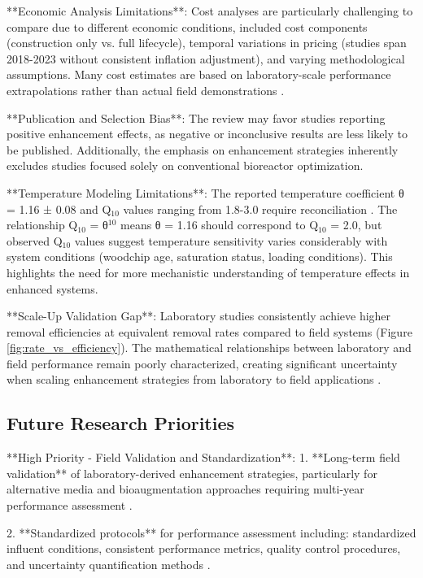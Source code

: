 \documentclass[12pt,a4paper]{article}
\begin{document}
**Economic Analysis Limitations**: Cost analyses are particularly challenging to compare due to different economic conditions, included cost components (construction only vs. full lifecycle), temporal variations in pricing (studies span 2018-2023 without consistent inflation adjustment), and varying methodological assumptions. Many cost estimates are based on laboratory-scale performance extrapolations rather than actual field demonstrations \citep{RN289}.

**Publication and Selection Bias**: The review may favor studies reporting positive enhancement effects, as negative or inconclusive results are less likely to be published. Additionally, the emphasis on enhancement strategies inherently excludes studies focused solely on conventional bioreactor optimization.

**Temperature Modeling Limitations**: The reported temperature coefficient θ = 1.16 ± 0.08 and Q$_{10}$ values ranging from 1.8-3.0 require reconciliation \citep{RN242, RN228}. The relationship Q$_{10}$ = θ$^{10}$ means θ = 1.16 should correspond to Q$_{10}$ = 2.0, but observed Q$_{10}$ values suggest temperature sensitivity varies considerably with system conditions (woodchip age, saturation status, loading conditions). This highlights the need for more mechanistic understanding of temperature effects in enhanced systems.

**Scale-Up Validation Gap**: Laboratory studies consistently achieve higher removal efficiencies at equivalent removal rates compared to field systems (Figure \ref{fig:rate_vs_efficiency}). The mathematical relationships between laboratory and field performance remain poorly characterized, creating significant uncertainty when scaling enhancement strategies from laboratory to field applications \citep{RN312}.

\subsection{Future Research Priorities}

**High Priority - Field Validation and Standardization**:
1. **Long-term field validation** of laboratory-derived enhancement strategies, particularly for alternative media and bioaugmentation approaches requiring multi-year performance assessment \citep{RN629}.

2. **Standardized protocols** for performance assessment including: standardized influent conditions, consistent performance metrics, quality control procedures, and uncertainty quantification methods \citep{RN310}.
\end{document}
